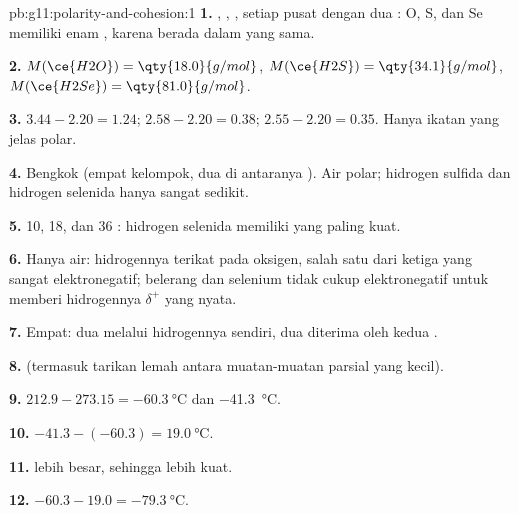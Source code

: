 \begin{solution}{pb:g11:polarity-and-cohesion:1}
\textbf{1.} , , , setiap  pusat
dengan dua : O, S, dan Se memiliki enam , karena berada dalam  yang sama.

\textbf{2.} $M(\ce{H2O}) = \qty{18.0}{g/mol}$, $M(\ce{H2S}) =
\qty{34.1}{g/mol}$, $M(\ce{H2Se}) = \qty{81.0}{g/mol}$.

\textbf{3.} $3.44 - 2.20 = 1.24$; $2.58 - 2.20 = 0.38$;
$2.55 - 2.20 = 0.35$. Hanya ikatan  yang jelas polar.

\textbf{4.} Bengkok (empat kelompok, dua di antaranya ).
Air polar; hidrogen sulfida dan hidrogen selenida hanya sangat sedikit.

\textbf{5.} 10, 18, dan 36 : hidrogen selenida memiliki
 yang paling kuat.

\textbf{6.} Hanya air:  hidrogennya terikat pada oksigen, salah
satu dari ketiga  yang sangat elektronegatif; belerang dan selenium
tidak cukup elektronegatif untuk memberi  hidrogennya
$\delta^+$ yang nyata.

\textbf{7.} Empat: dua melalui  hidrogennya sendiri, dua
diterima oleh kedua .

\textbf{8.}  (termasuk tarikan lemah antara
muatan-muatan parsial yang kecil).

\textbf{9.} $212.9 - 273.15 = \qty{-60.3}{\celsius}$ dan
\qty{-41.3}{\celsius}.

\textbf{10.} $-41.3 - (-60.3) = \qty{19.0}{\celsius}$.

\textbf{11.}  lebih besar, sehingga 
lebih kuat.

\textbf{12.} $-60.3 - 19.0 = \qty{-79.3}{\celsius}$.


\end{solution}
